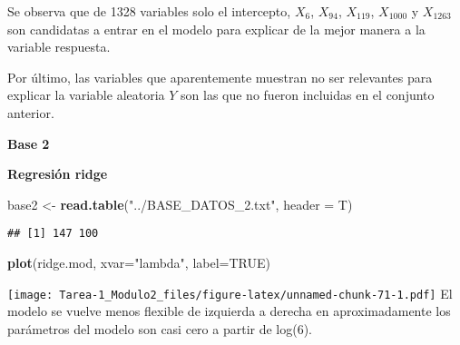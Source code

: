 \documentclass[
]{article}
\newenvironment{Shaded}{\begin{snugshade}}{\end{snugshade}}
\newcommand{\CommentTok}[1]{\textcolor[rgb]{0.56,0.35,0.01}{\textit{#1}}}
\newcommand{\DataTypeTok}[1]{\textcolor[rgb]{0.13,0.29,0.53}{#1}}
\newcommand{\DecValTok}[1]{\textcolor[rgb]{0.00,0.00,0.81}{#1}}
\newcommand{\KeywordTok}[1]{\textcolor[rgb]{0.13,0.29,0.53}{\textbf{#1}}}
\newcommand{\NormalTok}[1]{#1}
\newcommand{\OperatorTok}[1]{\textcolor[rgb]{0.81,0.36,0.00}{\textbf{#1}}}
\newcommand{\OtherTok}[1]{\textcolor[rgb]{0.56,0.35,0.01}{#1}}
\newcommand{\StringTok}[1]{\textcolor[rgb]{0.31,0.60,0.02}{#1}}
\begin{document}
Se observa que de 1328 variables solo el intercepto, \(X_6\),
\(X_{94}\), \(X_{119}\), \(X_{1000}\) y \(X_{1263}\) son candidatas a
entrar en el modelo para explicar de la mejor manera a la variable
respuesta.

Por último, las variables que aparentemente muestran no ser relevantes
para explicar la variable aleatoria \(Y\) son las que no fueron
incluidas en el conjunto anterior.

\textbf{Base 2 }

\textbf{Regresión ridge}

\begin{Shaded}
\begin{Highlighting}[]
\NormalTok{base2 <-}\StringTok{ }\KeywordTok{read.table}\NormalTok{(}\StringTok{"../BASE_DATOS_2.txt"}\NormalTok{, }\DataTypeTok{header =}\NormalTok{ T)}
\end{Highlighting}
\end{Shaded}

\begin{Shaded}
\end{Shaded}

\begin{verbatim}
## [1] 147 100
\end{verbatim}

\begin{Shaded}
\begin{Highlighting}[]
\KeywordTok{plot}\NormalTok{(ridge.mod, }\DataTypeTok{xvar=}\StringTok{"lambda"}\NormalTok{, }\DataTypeTok{label=}\OtherTok{TRUE}\NormalTok{)}
\end{Highlighting}
\end{Shaded}

\texttt{[image: Tarea-1\_Modulo2\_files/figure-latex/unnamed-chunk-71-1.pdf]}
El modelo se vuelve menos flexible de izquierda a derecha en
aproximadamente los parámetros del modelo son casi cero a partir de
log(6).
\end{document}
